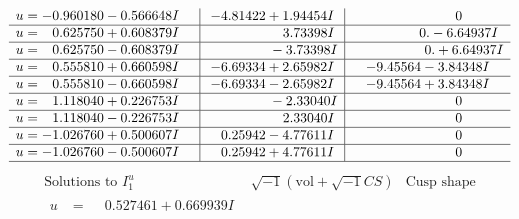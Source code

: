 \documentclass[1p]{elsarticle_modified}
\theoremstyle{definition}
\newcommand{\I}{\sqrt{-1}}
\begin{document}
$$\begin{array}{c|c|c}
\begin{aligned}
u &= -0.960180 - 0.566648 I\end{aligned}
 & -4.81422 + 1.94454 I & \phantom{-0.000000 } 0 \\ \hline\begin{aligned}
u &= \phantom{-}0.625750 + 0.608379 I\end{aligned}
 & \phantom{-0.000000 -}3.73398 I & \phantom{-0.000000 } 0. - 6.64937 I \\ \hline\begin{aligned}
u &= \phantom{-}0.625750 - 0.608379 I\end{aligned}
 & \phantom{-0.000000 } -3.73398 I & \phantom{-0.000000 -}0. + 6.64937 I \\ \hline\begin{aligned}
u &= \phantom{-}0.555810 + 0.660598 I\end{aligned}
 & -6.69334 + 2.65982 I & -9.45564 - 3.84348 I \\ \hline\begin{aligned}
u &= \phantom{-}0.555810 - 0.660598 I\end{aligned}
 & -6.69334 - 2.65982 I & -9.45564 + 3.84348 I \\ \hline\begin{aligned}
u &= \phantom{-}1.118040 + 0.226753 I\end{aligned}
 & \phantom{-0.000000 } -2.33040 I & \phantom{-0.000000 } 0 \\ \hline\begin{aligned}
u &= \phantom{-}1.118040 - 0.226753 I\end{aligned}
 & \phantom{-0.000000 -}2.33040 I & \phantom{-0.000000 } 0 \\ \hline\begin{aligned}
u &= -1.026760 + 0.500607 I\end{aligned}
 & \phantom{-}0.25942 - 4.77611 I & \phantom{-0.000000 } 0 \\ \hline\begin{aligned}
u &= -1.026760 - 0.500607 I\end{aligned}
 & \phantom{-}0.25942 + 4.77611 I & \phantom{-0.000000 } 0\\
 \hline 
 \end{array}$$\newpage$$\begin{array}{c|c|c}  
\text{Solutions to }I^u_{1}& \I (\text{vol} + \sqrt{-1}CS) & \text{Cusp shape}\\
 \hline 
\begin{aligned}
u &= \phantom{-}0.527461 + 0.669939 I\end{aligned}

\end{array}$$
\end{document}
